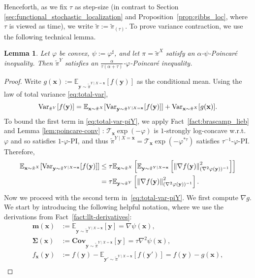 \documentclass[11pt]{article}
\newtheorem{lemma}{Lemma}
\newcommand{\defeq}{:=}
\newcommand{\norm}[1]{\left\lVert#1\right\rVert}
\newcommand{\E}{\mathbb{E}}
\newcommand{\Var}{\textup{Var}}
\newcommand{\Brack}[1]{\left[#1\right]}
\newcommand{\Cov}{\mathbf{Cov}}
\newcommand{\0}{\mathbf{0}}
\newcommand{\1}{\mathbf{1}}
\newcommand{\vm}{\mathbf{m}}
\newcommand{\vx}{\mathbf{x}}
\newcommand{\vy}{\mathbf{y}}
\newcommand{\msig}{\boldsymbol{\Sigma}}
\newcommand{\tilt}{\mathcal{T}}
\newcommand{\vhi}{\varphi}
\newcommand{\tpi}{\tilde{\pi}}
\begin{document}
Henceforth, as we fix $\tau$ as step-size (in contrast to Section \ref{sec:functional_stochastic_localization} and Proposition~\ref{prop:gibbs_loc}, where $\tau$ is viewed as time), we write $\tpi:=\tpi_{(\tau)}$.  To prove variance contraction, we use the following technical lemma.
\begin{lemma}\label{lem:dual-poincare}
    Let $\vhi$ be convex, $\psi\defeq \vhi^\sharp$, and let $\pi=\tpi^X$ satisfy an $\alpha$-$\psi$-Poincar\'e inequality.  Then $\tilde{\pi}^Y$ satisfies an $\frac{\alpha}{\tau(\alpha+\tau)}$-$\vhi$-Poincar\'e inequality.
\end{lemma}
\begin{proof}
Write $g(\vx) \defeq \mathbb{E}_{\vy\sim \tilde{\pi}^{Y\mid X=\vx}}[f(\vy)]$ as the conditional mean. Using the law of total variance \eqref{eq:total-var},
\begin{equation}\label{eq:total-var-piY}\Var_{\tpi^Y}[f(\vy)] = \E_{\vx \sim \tpi^X}[\Var_{\vy \sim \tilde{\pi}^{Y\mid X=\vx}}[f(\vy)]] + \Var_{\vx \sim \tpi^X}[g(\vx)].\end{equation}
To bound the first term in \eqref{eq:total-var-piY}, we apply Fact~\ref{fact:brascamp_lieb} and Lemma \ref{lem:poincare-conv} : $\tilt_{\vx}\exp(-\vhi)$ is $1$-strongly log-concave w.r.t.\ $\vhi$ and so satisfies $1$-$\vhi$-PI, and thus $\tilde{\pi}^{Y\mid X=\vx}=\mathcal{T}_{\vx}\exp(-\vhi^{*\tau})$ satisfies $\tau^{-1}$-$\vhi$-PI.  Therefore,
\begin{equation}\label{eq:dpi_term1}
\begin{aligned}\E_{\vx \sim \tpi^X}[\Var_{\vy \sim \tilde{\pi}^{Y\mid X=\vx}}[f(\vy)]] &\le \tau \E_{\vx \sim \tpi^X}\Brack{\E_{\vy \sim \tilde{\pi}^{Y\mid X=\vx}}\Brack{\norm{\nabla f(\vy)}_{(\nabla^2 \vhi(\vy))^{-1}}^2}} \\
&= \tau \E_{\vy \sim \tpi^Y }\Brack{\norm{\nabla f(\vy)}_{(\nabla^2 \vhi(\vy))^{-1}}^2}.
\end{aligned}
\end{equation}
Now we proceed with the second term in~\eqref{eq:total-var-piY}. We first compute $\nabla g$. We start by introducing the following helpful notation, where we use the derivations from Fact~\ref{fact:llt-derivatives}:
\begin{align*}
\vm(\vx) &\defeq \E_{\vy \sim \tilde{\pi}^{Y\mid X=\vx}}[\vy] = \nabla \psi(\vx), \\
\msig(\vx) &\defeq \Cov_{\vy \sim \tilde{\pi}^{Y\mid X=\vx}}[\vy] = \tau\nabla^2 \psi(\vx), \\
f_\vx(\vy) &\defeq f(\vy) - \E_{\vy' \sim \tilde{\pi}^{Y\mid X=\vx}}[f(\vy')]= f(\vy) - g(\vx), \\

\end{align*}
\end{proof}
\end{document}

